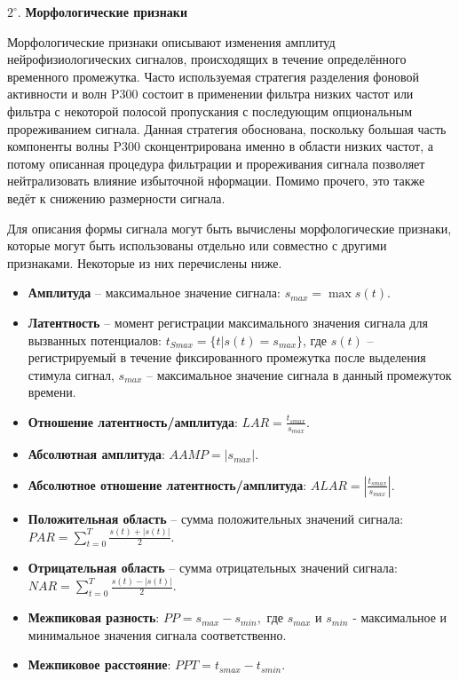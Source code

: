 \documentclass[12pt,fleqn]{article}
\begin{document}
	\par $2^{\circ}.$ {\bf Морфологические признаки}
	\par Морфологические признаки описывают изменения амплитуд нейрофизиологических сигналов, происходящих в течение определённого временного промежутка. Часто используемая стратегия разделения фоновой активности и волн P300 состоит в применении фильтра низких частот или фильтра с некоторой полосой пропускания с последующим опциональным прореживанием сигнала. Данная стратегия обоснована, поскольку большая часть компоненты волны P300 сконцентрирована именно в области низких частот, а потому описанная процедура фильтрации и прореживания сигнала позволяет нейтрализовать влияние избыточной нформации. Помимо прочего, это также ведёт к снижению размерности сигнала.
	\par Для описания формы сигнала могут быть вычислены морфологические признаки, которые могут быть использованы отдельно или совместно с другими признаками. Некоторые из них перечислены ниже.
	\begin{itemize}
	\item 
	{\bf Амплитуда} -- максимальное значение сигнала: $s_{max} = \max{s(t)}$.
	\item
	{\bf Латентность} -- момент регистрации максимального значения сигнала для вызванных потенциалов: $t_{Smax} = \{ t | s(t) = s_{max} \}$, где $s(t)$ -- регистрируемый в течение фиксированного промежутка после выделения стимула сигнал, $s_{max}$ -- максимальное значение сигнала в данный промежуток времени.
	\item
	{\bf Отношение латентность/амплитуда}: $LAR = \frac{t_{smax}}{s_{max}}$.
	\item
	{\bf Абсолютная амплитуда}: $AAMP = |s_{max}|.$
	\item
	{\bf Абсолютное отношение латентность/амплитуда}: $ALAR = \left| \frac{t_{smax}}{s_{max}} \right|$.
	\item
	{\bf Положительная область} -- сумма положительных значений сигнала: $PAR = \sum_{t = 0} ^ T \frac{s(t) + |s(t)|}{2}.$
	\item
	{\bf Отрицательная область} -- сумма отрицательных значений сигнала: $NAR = \sum_{t = 0} ^ T \frac{s(t) - |s(t)|}{2}.$
	\item
	{\bf Межпиковая разность}: $PP = s_{max} - s_{min},$ где $s_{max}$ и $s_{min}$ - максимальное и минимальное значения сигнала соответственно.
	\item
	{\bf Межпиковое расстояние}: $PPT = t_{smax} - t_{smin}.$
	\end{itemize}
\end{document}
